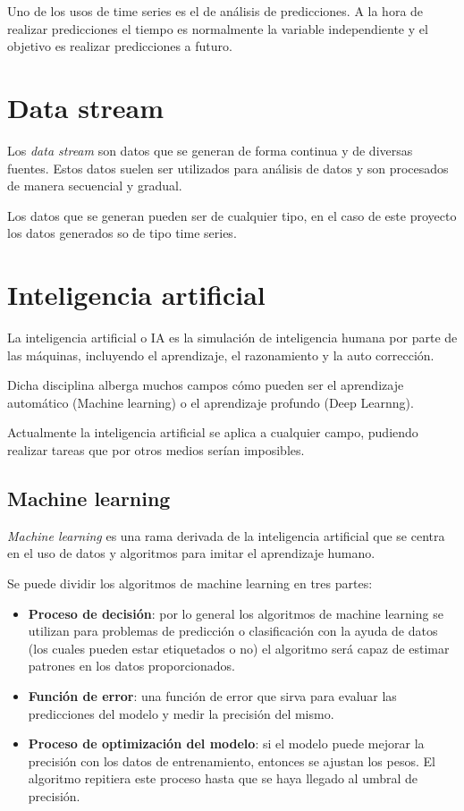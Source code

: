 Uno de los usos de time series es el de análisis de predicciones. A la hora de realizar predicciones el tiempo es normalmente la variable independiente y el objetivo es realizar predicciones a futuro. \cite{pagina:toward_data_scince}

\section{Data stream}

Los \textit{data stream} son datos que se generan de forma continua y de diversas fuentes. Estos datos suelen ser utilizados para análisis de datos y son procesados de manera secuencial y gradual.

Los datos que se generan pueden ser de cualquier tipo, en el caso de este proyecto los datos generados so de tipo time series.\cite{pagina:AWS_dataStream}


\section{Inteligencia artificial}

La inteligencia artificial o IA es la simulación de inteligencia humana por parte de las máquinas, incluyendo el aprendizaje, el razonamiento y la auto corrección.

Dicha disciplina alberga muchos campos cómo pueden ser el aprendizaje automático (Machine learning) o el aprendizaje profundo (Deep Learnng).

Actualmente la inteligencia artificial se aplica a cualquier campo, pudiendo realizar tareas que por otros medios serían imposibles.\cite{pagina:techtarget}  

\subsection{Machine learning}

\textit{Machine learning} es una rama derivada de la inteligencia artificial que se centra en el uso de datos y algoritmos para imitar el aprendizaje humano. \cite{pagina:IBM_Machine_learning}

Se puede dividir los algoritmos de machine learning en tres partes:

\begin{itemize}
    \item \textbf{Proceso de decisión}: por lo general los algoritmos de machine learning se utilizan para problemas de predicción o clasificación con la ayuda de datos (los cuales pueden estar etiquetados o no) el algoritmo será capaz de estimar patrones en los datos proporcionados.
    \item \textbf{Función de error}: una función de error que sirva para evaluar las predicciones del modelo y medir la precisión del mismo.
    
    \item \textbf{Proceso de optimización del modelo}: si el modelo puede mejorar la precisión con los datos de entrenamiento, entonces se ajustan los pesos. El algoritmo repitiera este proceso hasta que se haya llegado al umbral de precisión.

\end{itemize}




